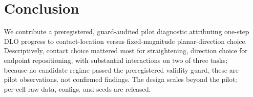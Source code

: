 \documentclass{article}
\begin{document}
\section{Conclusion}
We contribute a preregistered, guard-audited pilot diagnostic attributing
one-step DLO progress to contact-location versus fixed-magnitude
planar-direction choice. Descriptively, contact choice mattered most for
straightening, direction choice for endpoint repositioning, with
substantial interactions on two of three tasks; because no candidate regime
passed the preregistered validity guard, these are pilot observations, not
confirmed findings. The design scales beyond the pilot; per-cell raw
data, configs, and seeds are released.

\clearpage


\end{document}
